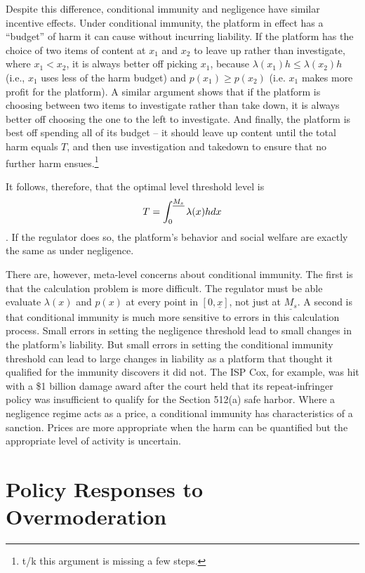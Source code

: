 Despite this difference, conditional immunity and negligence have similar incentive effects. Under conditional immunity, the platform in effect has a ``budget'' of harm it can cause without incurring liability. If the platform has the choice of two items of content at $x_1$ and $x_2$ to leave up rather than investigate, where $x_1 < x_2$, it is always better off picking $x_1$, because $\lambda(x_1)h \le \lambda(x_2)h$ (i.e., $x_1$ uses less of the harm budget) and $p(x_1) \ge p(x_2)$ (i.e. $x_1$ makes more profit for the platform). A similar argument shows that if the platform is choosing between two items to investigate rather than take down, it is always better off choosing the one to the left to investigate. And finally, the platform is best off spending all of its budget -- it should leave up content until the total harm equals $T$, and then use investigation and takedown to ensure that no further harm ensues.\footnote{t/k this argument is missing a few steps.}

It follows, therefore, that the optimal level threshold level is \begin{equation*}T = \int_0^{\underline{M_s}} \lambda(x)h dx\end{equation*}. If the regulator does so, the platform's behavior and social welfare are exactly the same as under negligence.

There are, however, meta-level concerns about conditional immunity. The first is that the calculation problem is more difficult. The regulator must be able evaluate $\lambda(x)$ and $p(x)$ at every point in $[0, \underline{x}]$, not just at $\underline{M_s}$. A second is that conditional immunity is much more sensitive to errors in this calculation process. Small errors in setting the negligence threshold lead to small changes in the platform's liability. But small errors in setting the conditional immunity threshold can lead to large changes in liability as a platform that thought it qualified for the immunity discovers it did not. The ISP Cox, for example, was hit with a \$1 billion damage award after the court held that its repeat-infringer policy was insufficient to qualify for the Section 512(a) safe harbor. Where a negligence regime acts as a price, a conditional immunity has characteristics of a sanction. Prices are more appropriate when the harm can be quantified but the appropriate level of activity is uncertain.


\section{Policy Responses to Overmoderation}
\label{sec:overmoderation}

